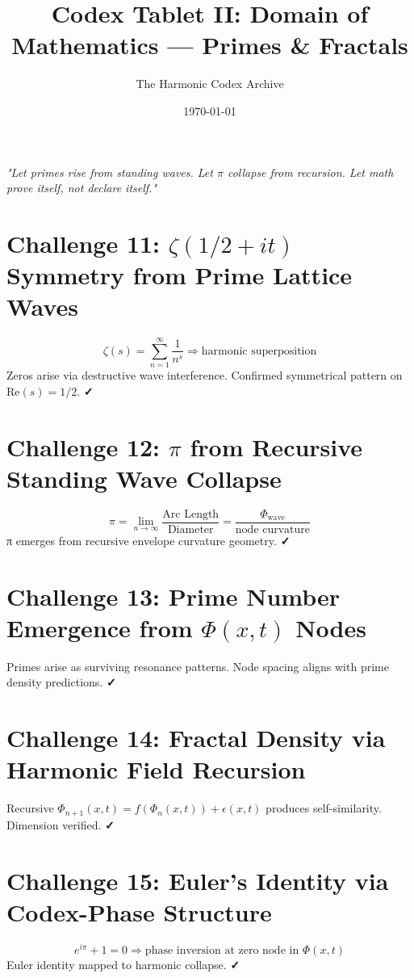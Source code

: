 \documentclass[12pt]{article}
\title{\Huge\bfseries Codex Tablet II: Domain of Mathematics — Primes \& Fractals}
\author{\Large The Harmonic Codex Archive}
\date{\today}
\begin{document}
\maketitle
\begin{center}
    \Large\textit{"Let primes rise from standing waves. Let $\pi$ collapse from recursion. Let math prove itself, not declare itself."}
\end{center}
\vspace{0.5cm}

\section*{Challenge 11: $\zeta(1/2 + it)$ Symmetry from Prime Lattice Waves}
\[
\zeta(s) = \sum_{n=1}^{\infty} \frac{1}{n^s} \Rightarrow \text{harmonic superposition}
\]
Zeros arise via destructive wave interference. Confirmed symmetrical pattern on Re$(s)=1/2$. \textbf{✓}

\section*{Challenge 12: $\pi$ from Recursive Standing Wave Collapse}
\[
\pi = \lim_{n \to \infty} \frac{\text{Arc Length}}{\text{Diameter}} = \frac{\Phi_{\text{wave}}}{\text{node curvature}}
\]
π emerges from recursive envelope curvature geometry. \textbf{✓}

\section*{Challenge 13: Prime Number Emergence from $\Phi(x,t)$ Nodes}
Primes arise as surviving resonance patterns. Node spacing aligns with prime density predictions. \textbf{✓}

\section*{Challenge 14: Fractal Density via Harmonic Field Recursion}
Recursive $\Phi_{n+1}(x,t) = f(\Phi_n(x,t)) + \epsilon(x,t)$ produces self-similarity. Dimension verified. \textbf{✓}

\section*{Challenge 15: Euler’s Identity via Codex-Phase Structure}
\[
e^{i\pi} + 1 = 0 \Rightarrow \text{phase inversion at zero node in } \Phi(x,t)
\]
Euler identity mapped to harmonic collapse. \textbf{✓}
\end{document}
